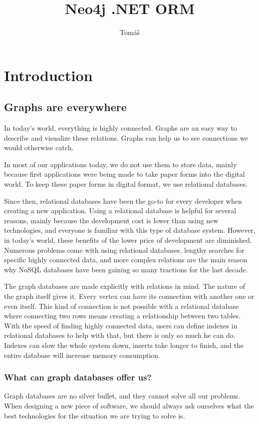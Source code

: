 \documentclass[thesis=M,english]{FITthesis}[2019/12/23]
\title{Neo4j .NET ORM}
\author{Tomáš} %
\begin{document}

\chapter{Introduction}

\section{Graphs are everywhere}
In today's world, everything is highly connected. Graphs are an easy way to describe and visualize these relations. Graphs can help us to see connections we would otherwise catch.

In most of our applications today, we do not use them to store data, mainly because first applications were being made to take paper forms into the digital world. To keep these paper forms in digital format, we use relational databases.

Since then, relational databases have been the go-to for every developer when creating a new application. Using a relational database is helpful for several reasons, mainly because the development cost is lower than using new technologies, and everyone is familiar with this type of database system. However, in today's world, these benefits of the lower price of development are diminished. Numerous problems come with using relational databases, lengthy searches for specific highly connected data, and more complex relations are the main reason why NoSQL databases have been gaining so many tractions for the last decade.

The graph databases are made explicitly with relations in mind. The nature of the graph itself gives it. Every vertex can have its connection with another one or even itself. This kind of connection is not possible with a relational database where connecting two rows means creating a relationship between two tables. With the speed of finding highly connected data, users can define indexes in relational databases to help with that, but there is only so much he can do. Indexes can slow the whole system down, inserts take longer to finish, and the entire database will increase memory consumption.

\subsection{What can graph databases offer us?}
Graph databases are no silver bullet, and they cannot solve all our problems. When designing a new piece of software, we should always ask ourselves what the best technologies for the situation we are trying to solve is.
\end{document}
